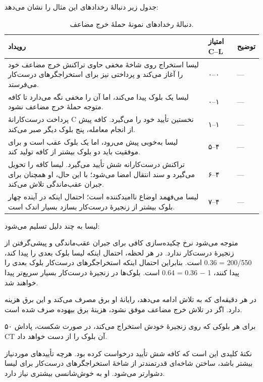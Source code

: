 \documentclass[oneside,a4paper,12pt]{book}
\newcommand{\پاورقی}[2]{%
  \footnote{%
    \scriptsize
    \setlength{\parindent}{0pt}%
    \setlength{\parskip}{0pt}%
    \lr{#1} -- معادل فارسی: #2%
  }}
\newcommand{\قاب}[3][]{%
  \begin{center}
  \fbox{\begin{minipage}{0.78\textwidth}
  \begin{flushright}
  \textbf{#2}\par\smallskip
  #3
  \end{flushright}
  \end{minipage}}
  \end{center}}
\begin{document}
جدول زیر دنبالهٔ رخدادهای این مثال را نشان می‌دهد:

\begin{table}[htbp]
\centering
\caption*{دنبالهٔ رخدادهای نمونهٔ حملهٔ خرج مضاعف.}
{\footnotesize\setlength{\tabcolsep}{2pt}
\renewcommand{\arraystretch}{1.2}
\begin{tabular}{|>{\centering\arraybackslash}p{}|>{\centering\arraybackslash}p{}|>{\centering\arraybackslash}p{}|}
\hline
\textbf{رویداد} & \textbf{امتیاز C–L} & \textbf{توضیح} \\ \hline
لیسا استخراج روی شاخهٔ مخفی حاوی تراکنش خرج مضاعف خود را آغاز می‌کند و پرداختی نیز برای استخراجگرهای درست‌کار می‌فرستد. & ۰–۰ & — \\ \hline
لیسا یک بلوک پیدا می‌کند، اما آن را مخفی نگه می‌دارد تا کافه متوجه حملهٔ خرج مضاعف نشود. & ۰–۱ & — \\ \hline
پرداخت درست‌کارانهٔ C نخستین تأیید خود را می‌گیرد. کافه پیش از انجام معامله، پنج بلوک دیگر صبر می‌کند. & ۱–۱ & — \\ \hline
لیسا به‌خوبی پیش می‌رود، اما یک بلوک عقب است و برای موفقیت باید دو بلوک بیشتر از کافه تولید کند. & ۵–۴ & — \\ \hline
تراکنش درست‌کارانه شش تأیید می‌گیرد. لیسا کافه را تحویل می‌گیرد و سند انتقال امضا می‌شود؛ با این حال، او همچنان برای جبران عقب‌ماندگی تلاش می‌کند. & ۶–۴ & — \\ \hline
لیسا می‌فهمد اوضاع ناامیدکننده است؛ احتمال اینکه در آینده چهار بلوک بیشتر از زنجیرهٔ درست‌کار بسازد بسیار اندک است. & ۷–۴ & — \\ \hline
\end{tabular}
}
\end{table}
لیسا به چند دلیل تسلیم می‌شود:

متوجه می‌شود نرخ چکیده‌سازی کافی برای جبران عقب‌ماندگی و پیشی‌گرفتن از زنجیرهٔ درست‌کار ندارد. در هر لحظه، احتمال اینکه لیسا بلوک بعدی را پیدا کند، 200/550 = 0.36 است. بنابراین احتمال اینکه استخراجگرهای درست‌کار بلوک بعدی را پیدا کنند، 1 − 0.36 = 0.64 است. بلوک‌ها در زنجیرهٔ درست‌کار بسیار سریع‌تر پیدا خواهند شد.

در هر دقیقه‌ای که به تلاش ادامه می‌دهد، رایانهٔ او برق مصرف می‌کند و این برق هزینه دارد. اگر در تلاش خرج مضاعف موفق نشود، هزینهٔ برق بیهوده صرف شده است.

برای هر بلوکی که روی زنجیرهٔ خودش استخراج می‌کند، در صورت شکست، پاداش ۵۰ CT آن بلوک را از دست خواهد داد.

نکتهٔ کلیدی این است که کافه شش تأیید درخواست کرده بود. هرچه تأییدهای موردنیاز بیشتر باشد، ساختن شاخه‌ای قدرتمندتر از شاخهٔ استخراجگرهای درست‌کار برای لیسا دشوارتر می‌شود. او به خوش‌شانسی بیشتری نیاز دارد.
\end{document}
